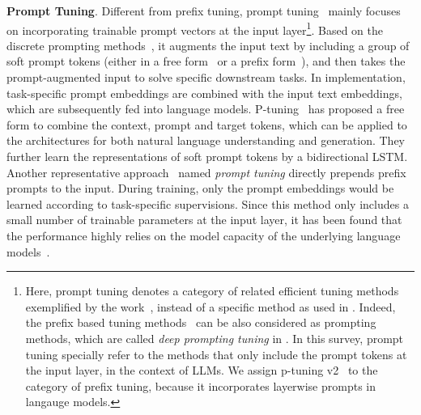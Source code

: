 \textbf{Prompt Tuning}. Different from prefix tuning, prompt tuning~\cite{Liu-arXiv-2021-GPT,Lester-ACL-2021-The}  mainly focuses on incorporating trainable prompt vectors at the input layer\footnote{Here, prompt tuning denotes a category of related efficient tuning methods exemplified by the work~\cite{Liu-arXiv-2021-GPT,Lester-ACL-2021-The,gu-ACL-2022-ppt}, instead of a specific method as used in \cite{Lester-ACL-2021-The}. Indeed, the prefix based tuning methods~\cite{Li-ACL-2021-prefix,Liu-arXiv-2021-P-tuning} can be also considered as prompting methods, which are called \emph{deep prompting tuning}   in \cite{Liu-arXiv-2021-P-tuning}. In this survey, prompt tuning specially refer to the methods that only include the prompt tokens at the input layer, in the context of LLMs. We assign p-tuning v2~\cite{Liu-arXiv-2021-P-tuning} to the category of prefix tuning, because it incorporates layerwise prompts in langauge models. }. Based on the discrete prompting methods~\cite{jiang-TACL-2020-how,shin-EMNLP-2020-autoprompt}, it  augments the input text  by including a group of soft prompt tokens (either in a free form~\cite{Liu-arXiv-2021-GPT} or a prefix form~\cite{Lester-ACL-2021-The}), and then takes the prompt-augmented input to solve specific downstream tasks. In implementation, task-specific prompt embeddings are combined with the input text embeddings, which are subsequently fed into language models. P-tuning~\cite{Liu-arXiv-2021-GPT} has proposed a free form to combine the context, prompt and target tokens, which can be applied to the  architectures for both natural language understanding and generation. They further learn the representations of soft prompt tokens by a bidirectional LSTM. Another representative approach~\cite{Lester-ACL-2021-The}  named \emph{prompt tuning} directly prepends  prefix prompts to the input. During training, only the prompt embeddings would be learned according to  task-specific supervisions. Since this method only includes a small number of trainable parameters at the input layer, it has been found that the performance highly relies on the model capacity of the underlying language models~\cite{Lester-ACL-2021-The}.  

